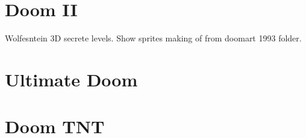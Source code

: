 \section{Doom II}
Wolfesntein 3D secrete levels. Show sprites making of from doomart 1993 folder.
\section{Ultimate Doom}
\section{Doom TNT}

